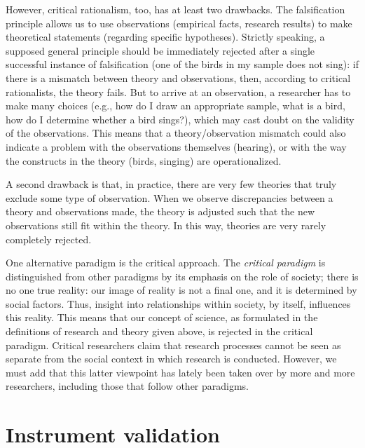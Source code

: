 \documentclass[
]{book}
\begin{document}
However, critical rationalism, too, has at least two drawbacks. The falsification principle allows us to use observations (empirical facts, research results) to make theoretical statements (regarding specific hypotheses). Strictly speaking, a supposed general principle should be immediately rejected after a single successful instance of falsification (one of the birds in my sample does not sing): if there is a mismatch between theory and observations, then, according to critical rationalists, the theory fails. But to arrive at an observation, a researcher has to make many choices (e.g., how do I draw an appropriate sample, what is a bird, how do I determine whether a bird sings?), which may cast doubt on the validity of the observations. This means that a theory/observation mismatch could also indicate a problem with the observations themselves (hearing), or with the way the constructs in the theory (birds, singing) are operationalized.

A second drawback is that, in practice, there are very few theories that truly exclude some type of observation. When we observe discrepancies between a theory and observations made, the theory is adjusted such that the new observations still fit within the theory. In this way, theories are very rarely completely rejected.

One alternative paradigm is the critical approach. The \emph{critical paradigm} is distinguished from other paradigms by its emphasis on the role of society; there is no one true reality: our image of reality is not a final one, and it is determined by social factors. Thus, insight into relationships within society, by itself, influences this reality. This means that our concept of science, as formulated in the definitions of research and theory given above, is rejected in the critical paradigm. Critical researchers claim that research processes cannot be seen as separate from the social context in which research is conducted. However, we must add that this latter viewpoint has lately been taken over by more and more researchers, including those that follow other paradigms.

\hypertarget{sec:instrument-validation}{%
\section{Instrument validation}\label{sec:instrument-validation}}
\end{document}

